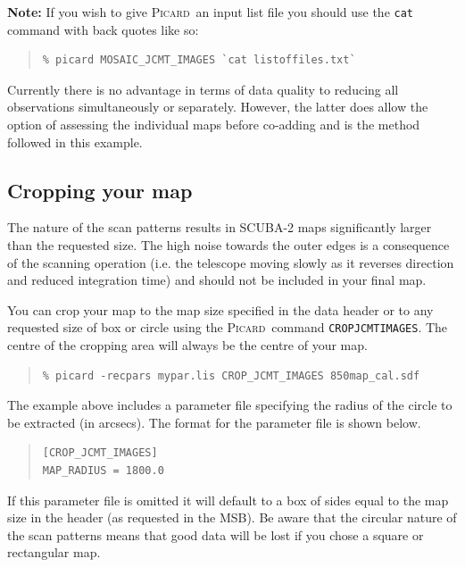 \documentclass[twoside,11pt]{article}
\newcommand{\xref}[3]{#1}
\newcommand{\xlabel}[1]{}
\renewcommand{\_}{\texttt{\symbol{95}}}
\newenvironment{myquote}{\begin{quote}\begin{small}}{\end{small}\end{quote}}
\newcommand{\picard}{\xref{\textsc{Picard}}{sun265}{}}
\newcommand{\param}[1]{\texttt{#1}}
\begin{document}
\textbf{Note:} If you wish to give \picard\ an input list file you should
use the \texttt{cat} command with back quotes like so:
\begin{myquote}
\begin{verbatim}
% picard MOSAIC_JCMT_IMAGES `cat listoffiles.txt`
\end{verbatim}
\end{myquote}


Currently there is no advantage in terms of data quality to reducing
all observations simultaneously or separately. However, the latter
does allow the option of assessing the individual maps before co-adding
and is the method followed in this example.

\subsection{\xlabel{crop}Cropping your map}
\label{sec:crop}

The nature of the scan patterns results in SCUBA-2 maps significantly
larger than the requested size. The high noise towards the outer edges
is a consequence of the scanning operation (i.e. the telescope moving
slowly as it reverses direction and reduced integration time) and
should not be included in your final map.

You can crop your map to the map size specified in the data header or
to any requested size of box or circle using the \picard\ command
\xref{\param{CROP\_JCMT\_IMAGES}}{sun265}{CROP_JCMT_IMAGES}. The centre
of the cropping area will always be the centre of your map.
\begin{myquote}
\begin{verbatim}
% picard -recpars mypar.lis CROP_JCMT_IMAGES 850map_cal.sdf
\end{verbatim}
\end{myquote}
The example above includes a parameter file specifying the radius of
the circle to be extracted (in arcsecs). The format for the parameter
file is shown below.
\begin{myquote}
\begin{verbatim}
[CROP_JCMT_IMAGES]
MAP_RADIUS = 1800.0
\end{verbatim}
\end{myquote}
If this parameter file is omitted it will default to a box of sides
equal to the map size in the header (as requested in the MSB). Be
aware that the circular nature of the scan patterns means that good
data will be lost if you chose a square or rectangular map.
\end{document}
